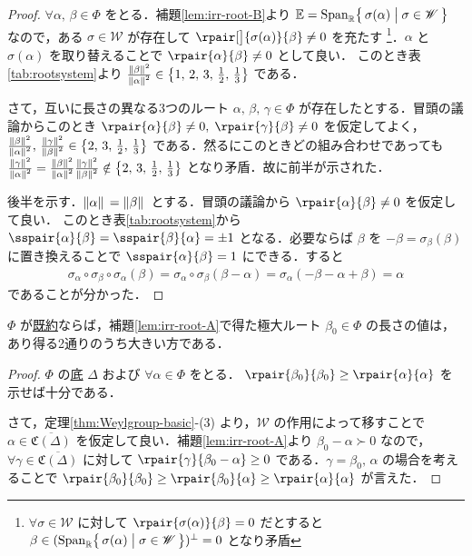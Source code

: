 \documentclass[rep_main]{subfiles}
\begin{document}
\begin{proof}
	$\forall \alpha,\, \beta \in \Phi$ をとる．補題\ref{lem:irr-root-B}より $\mathbb{E} = \operatorname{Span}_{\mathbb{R}} \bigl\{\, \sigma(\alpha) \bigm| \sigma \in \mathscr{W} \,\bigr\}$ なので，ある $\sigma \in \mathscr{W}$ が存在して $\rpair[\big]{\sigma(\alpha)}{\beta} \neq 0$ を充たす
	\footnote{$\forall \sigma \in \mathscr{W}$ に対して $\rpair{\sigma(\alpha)}{\beta} = 0$ だとすると $\beta \in (\operatorname{Span}_{\mathbb{R}} \bigl\{\, \sigma(\alpha) \bigm| \sigma \in \mathscr{W} \,\bigr\})^\perp = 0$ となり矛盾}．$\alpha$ と $\sigma(\alpha)$ を取り替えることで
	$\rpair{\alpha}{\beta} \neq 0$ として良い．
	このとき表\ref{tab:rootsystem}より $\frac{\norm*{\beta}^2}{\norm*{\alpha}^2} \in \bigl\{ 1,\, 2,\, 3,\, \frac{1}{2},\, \frac{1}{3} \bigr\}$ である．

	さて，互いに長さの異なる3つのルート $\alpha,\, \beta,\, \gamma \in \Phi$ が存在したとする．冒頭の議論からこのとき $\rpair{\alpha}{\beta} \neq 0,\; \rpair{\gamma}{\beta} \neq 0$ を仮定してよく，$\frac{\norm*{\beta}^2}{\norm*{\alpha}^2},\, \frac{\norm*{\gamma}^2}{\norm*{\beta}^2} \in \bigl\{ 2,\, 3,\, \frac{1}{2},\, \frac{1}{3}\bigr\}$ である．然るにこのときどの組み合わせであっても $\frac{\norm*{\gamma}^2}{\norm*{\alpha}^2} = \frac{\norm*{\beta}^2}{\norm*{\alpha}^2} \frac{\norm*{\gamma}^2}{\norm*{\beta}^2} \notin \bigl\{ 2,\, 3,\, \frac{1}{2},\, \frac{1}{3}\bigr\}$ となり矛盾．故に前半が示された．

	後半を示す．$\norm*{\alpha}	= \norm*{\beta}$ とする．冒頭の議論から $\rpair{\alpha}{\beta} \neq 0$ を仮定して良い．
	このとき表\ref{tab:rootsystem}から $\sspair{\alpha}{\beta} = \sspair{\beta}{\alpha} = \pm 1$ となる．必要ならば $\beta$ を $-\beta = \sigma_\beta(\beta)$ に置き換えることで $\sspair{\alpha}{\beta} = 1$ にできる．すると
	\begin{align}
		\sigma_\alpha \circ \sigma_\beta \circ \sigma_\alpha (\beta)
		= \sigma_\alpha \circ \sigma_\beta (\beta - \alpha) = \sigma_\alpha(- \beta - \alpha + \beta) = \alpha
	\end{align}
	であることが分かった．
\end{proof}


\begin{mylem}[label=lem:irr-root-D]{}
	$\Phi$ が\hyperref[def:irr-root]{既約}ならば，補題\ref{lem:irr-root-A}で得た極大ルート $\beta_0 \in \Phi$ の長さの値は，あり得る2通りのうち大きい方である．
\end{mylem}

\begin{proof}
	$\Phi$ の\hyperref[def:base-root]{底} $\Delta$ および $\forall \alpha \in \Phi$ をとる．
	$\rpair{\beta_0}{\beta_0} \ge \rpair{\alpha}{\alpha}$ を示せば十分である．

	さて，定理\ref{thm:Weylgroup-basic}-(3) より，$\mathscr{W}$ の作用によって移すことで $\alpha \in \overline{\mathfrak{C}(\Delta)}$ を仮定して良い．補題\ref{lem:irr-root-A}より $\beta_0 -\alpha \succ 0$ なので，$\forall \gamma \in \overline{\mathfrak{C}(\Delta)}$ に対して $\rpair{\gamma}{\beta_0 - \alpha} \ge 0$ である．$\gamma = \beta_0,\, \alpha$ の場合を考えることで $\rpair{\beta_0}{\beta_0} \ge \rpair{\beta_0}{\alpha} \ge \rpair{\alpha}{\alpha}$ が言えた．
\end{proof}
\end{document}
